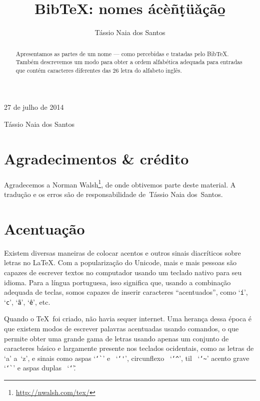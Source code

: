 \documentclass[article,openany]{memoir}
\title{Bib\TeX: nomes ácèñ\d{t}ü\v{a}çã\b{o}}
\author{Tássio Naia dos Santos}
\newcommand*{\astt}[1]{%
  `\thinspace\texttt{#1}\thinspace'}
\begin{document}



\hfill 27 de julho de 2014

\medskip

\noindent Tássio Naia dos Santos



\bigskip

\begin{abstract}
Apresentamos as partes de um nome --- como percebidas e tratadas pelo
Bib\TeX. Também descrevemos um modo para obter a ordem alfabética
adequada para entradas que contém caracteres diferentes das 26 letra
do alfabeto inglês.
\end{abstract}


\chapter*{Agradecimentos \& crédito}

Agradecemos a Norman Walsh\footnote{\url{http://nwalsh.com/tex/}}, de
onde obtivemos parte deste material. A tradução e os erros são de
responsabilidade de~Tássio Naia dos~Santos.



\chapter{Acentuação}

Existem diversas maneiras de colocar acentos e outros sinais
diacríticos sobre letras no \LaTeX. Com a popularização do Unicode,
mais e mais pessoas são capazes de escrever textos no computador
usando um teclado nativo para seu idioma. Para a língua portuguesa,
isso significa que, usando a combinação adequada de teclas, somos
capazes de inserir caracteres ``acentuados'', como \astt{í}, \astt{c},
\astt{ã}, \astt{ê}, etc.

Quando o \TeX\ foi criado, não havia sequer internet. Uma herança
dessa época é que existem modos de escrever palavras acentuadas usando
comandos, o que permite obter uma grande gama de letras usando apenas
um conjunto de caracteres básico e largamente presente nos teclados
ocidentais, como as letras de `a' a~`z', e sinais como aspas
\astt{\char`\`} e~\astt{\char`\'}, circunflexo~\astt{\char`\^},
til~\astt{\char`\~} acento grave~\astt{\char`\`} e aspas duplas~\astt{\char`\"}.
\end{document}
